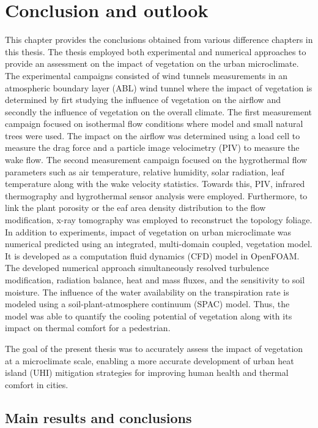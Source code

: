 \chapter{Conclusion and outlook}
\label{ch:conclusions}

This chapter provides the conclusions obtained from various difference chapters in this thesis. The thesis employed both experimental and numerical approaches to provide an assessment on the impact of vegetation on the urban microclimate. The experimental campaigns consisted of wind tunnels measurements in an atmospheric boundary layer (ABL) wind tunnel where the impact of vegetation is determined by firt studying the influence of vegetation on the airflow and secondly the influence of vegetation on the overall climate. The first measurement campaign focused on isothermal flow conditions where model and small natural trees were used. The impact on the airflow was determined using a load cell to measure the drag force and a particle image velocimetry (PIV) to measure the wake flow. The second measurement campaign focused on the hygrothermal flow parameters such as air temperature, relative humidity, solar radiation, leaf temperature along with the wake velocity statistics. Towards this, PIV, infrared thermography and hygrothermal sensor analysis were employed. Furthermore, to link the plant porosity or the eaf area density distribution to the flow modification, x-ray tomography was employed to reconstruct the topology foliage. In addition to experiments, impact of vegetation on urban microclimate was numerical predicted using an integrated, multi-domain coupled, vegetation model. It is developed as a computation fluid dynamics (CFD) model in OpenFOAM. The developed numerical approach simultaneously resolved turbulence modification, radiation balance, heat and mass fluxes, and the sensitivity to soil moisture. The influence of the water availability on the transpiration rate is modeled using a soil-plant-atmosphere continuum (SPAC) model.  Thus, the model was able to quantify the cooling potential of vegetation along with its impact on thermal comfort for a pedestrian.

The goal of the present thesis was to accurately assess the impact of vegetation at a microclimate scale, enabling a more accurate development of urban heat island (UHI) mitigation strategies for improving human health and thermal comfort in cities.

\section{Main results and conclusions}

